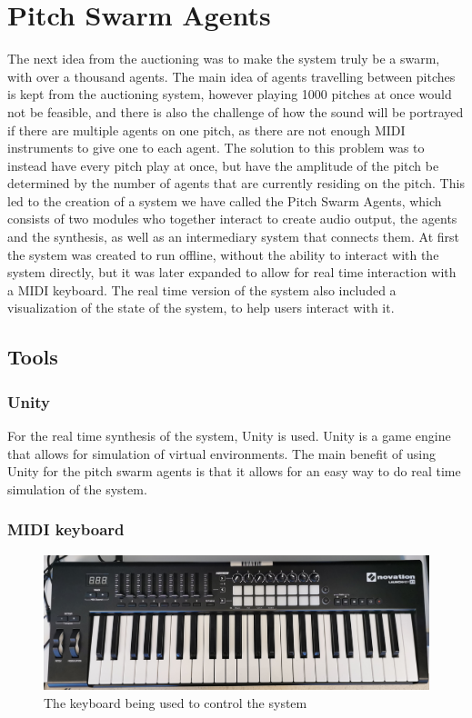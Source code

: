 \documentclass[a4paper,english]{report}
\begin{document}
	\section{Pitch Swarm Agents}
	The next idea from the auctioning was to make the system truly be a swarm, with over a thousand agents. The main idea of agents travelling between pitches is kept from the auctioning system, however playing 1000 pitches at once would not be feasible, and there is also the challenge of how the sound will be portrayed if there are multiple agents on one pitch, as there are not enough MIDI instruments to give one to each agent. The solution to this problem was to instead have every pitch play at once, but have the amplitude of the pitch be determined by the number of agents that are currently residing on the pitch. This led to the creation of a system we have called the Pitch Swarm Agents, which consists of two modules who together interact to create audio output, the agents and the synthesis, as well as an intermediary system that connects them. At first the system was created to run offline, without the ability to interact with the system directly, but it was later expanded to allow for real time interaction with a MIDI keyboard. The real time version of the system also included a visualization of the state of the system, to help users interact with it.
	\subsection{Tools}
	\subsubsection{Unity}
	For the real time synthesis of the system, Unity is used. Unity is a game engine that allows for simulation of virtual environments. The main benefit of using Unity for the pitch swarm agents is that it allows for an easy way to do real time simulation of the system.
	
	\subsubsection{MIDI keyboard}
	\begin{figure}
		\centering
		\includegraphics[width=0.7\linewidth]{keyboard}
		\caption{The keyboard being used to control the system}
		\label{fig:keyboard}
	\end{figure}
	
\end{document}
